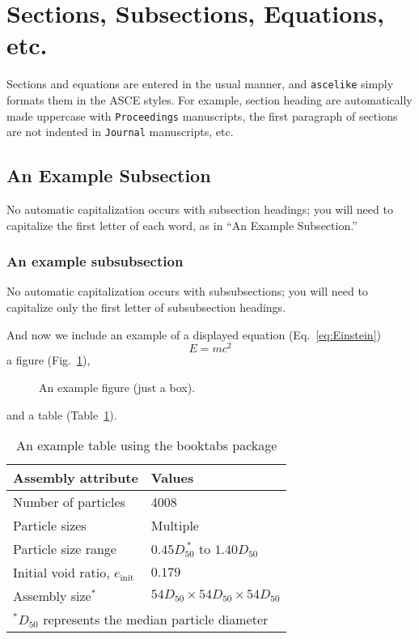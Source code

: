 \documentclass[Proceedings]{ascelike}
\begin{document}
\section{Sections, Subsections, Equations, etc.}\label{sec:Sections}
Sections and equations are entered in the usual manner,
and \texttt{ascelike} simply formats them in the ASCE styles.
For example,
section heading are automatically made uppercase with
\texttt{Proceedings} manuscripts, the first paragraph of sections
are not indented in \texttt{Journal} manuscripts, etc.
%
\subsection{An Example Subsection}\label{sec:Example}
%
No automatic capitalization occurs with subsection headings; 
you will need to capitalize the first letter of each word,
as in ``An Example Subsection.''
%
\subsubsection{An example subsubsection}%
\label{sec:Example2}
No automatic capitalization occurs with subsubsections; 
you will need to capitalize only the first letter of subsubsection 
headings.
\par
And now we include an example of a displayed equation (Eq.~\ref{eq:Einstein})
%
\begin{equation} \label{eq:Einstein}
E = m c^{2}
\end{equation}
%
a figure (Fig.~\ref{fig:box_fig}),%
%
\begin{figure}
  \centering
  \framebox[3.00in]{\rule[0in]{0in}{1.00in}}
  \caption{An example figure (just a box).}
  \label{fig:box_fig}
%
\end{figure}
%
and a table (Table~\ref{table:assembly}).
%
\begin{table}
  \caption{An example table using the booktabs package}
  \label{table:assembly}
  \centering
  \small
  \begin{tabular}{ll}
    \toprule
    Assembly attribute & Values \\
    \midrule
    Number of particles & 4008 \\
    Particle sizes & Multiple  \\
    Particle size range & $0.45D_{50}^{\:\ast}$ to $1.40D_{50}$ \\
    Initial void ratio, $e_{\mathrm{init}}$ & $0.179$ \\
    Assembly size$^{\ast}$ & $54D_{50} \times 54D_{50} \times 54D_{50}$ \\
    \bottomrule
    \multicolumn{2}{l}{$^\ast$$D_{50}$ represents the median particle diameter}
  \end{tabular}
\end{table}
%
\end{document}
